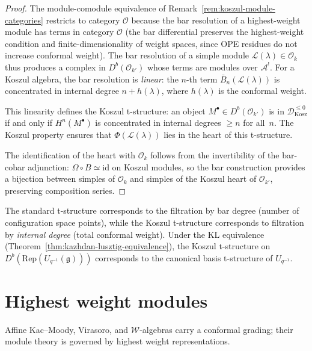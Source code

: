 \begin{proof}
The module-comodule equivalence of
Remark~\ref{rem:koszul-module-categories} restricts to category
$\mathcal{O}$ because the bar resolution of a highest-weight module
has terms in category $\mathcal{O}$ (the bar differential preserves
the highest-weight condition and finite-dimensionality of weight
spaces, since OPE residues do not increase conformal weight).
The bar resolution of a simple module
$\mathcal{L}(\lambda) \in \mathcal{O}_k$ thus produces a complex in
$D^b(\mathcal{O}_{k'})$ whose terms are modules over $\mathcal{A}^!$.
For a Koszul algebra, the bar resolution is \emph{linear}: the
$n$-th term $\bar{B}_n(\mathcal{L}(\lambda))$ is concentrated in
internal degree $n + h(\lambda)$, where $h(\lambda)$ is the
conformal weight.

This linearity defines the Koszul t-structure: an object
$M^\bullet \in D^b(\mathcal{O}_{k'})$ is in
$\mathcal{D}^{\leq 0}_{\mathrm{Kosz}}$ if and only if
$H^n(M^\bullet)$ is concentrated in internal degrees $\geq n$
for all~$n$.  The Koszul property ensures that $\Phi(\mathcal{L}(\lambda))$
lies in the heart of this t-structure.

The identification of the heart with $\mathcal{O}_k$ follows from
the invertibility of the bar-cobar adjunction: $\Omega \circ B \simeq
\mathrm{id}$ on Koszul modules, so the bar construction provides a
bijection between simples of $\mathcal{O}_k$ and simples of the
Koszul heart of $\mathcal{O}_{k'}$, preserving composition series.
\end{proof}

\begin{remark}
\label{rem:t-structure-geometry}
The standard t-structure corresponds to the filtration by bar degree (number of configuration space points), while the Koszul t-structure corresponds to filtration by \emph{internal degree} (total conformal weight).  Under the KL equivalence (Theorem~\ref{thm:kazhdan-lusztig-equivalence}), the Koszul t-structure on $D^b(\mathrm{Rep}(U_{q^{-1}}(\mathfrak{g})))$ corresponds to the canonical basis t-structure of $U_{q^{-1}}$.
\end{remark}

\section{Highest weight modules}\label{sec:highest-weight-modules}

Affine Kac--Moody, Virasoro, and $\mathcal{W}$-algebras carry
a conformal grading; their module theory is governed by highest
weight representations.

